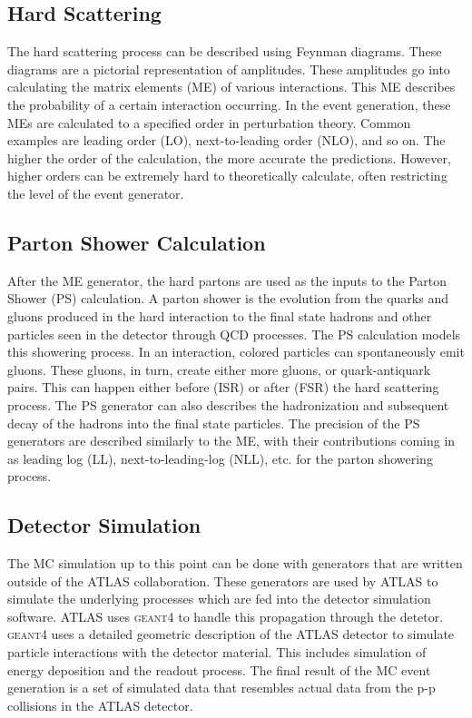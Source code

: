 \subsection{Hard Scattering}
\indent The hard scattering process can be described using Feynman diagrams. These diagrams are a pictorial representation of amplitudes. These amplitudes go into calculating the matrix elements (ME) of various interactions. This ME describes the probability of a certain interaction occurring. In the event generation, these MEs are calculated to a specified order in perturbation theory. Common examples are leading order (LO), next-to-leading order (NLO), and so on. The higher the order of the calculation, the more accurate the predictions. However, higher orders can be extremely hard to theoretically calculate, often restricting the level of the event generator.
\subsection{Parton Shower Calculation}
\indent  After the ME generator, the hard partons are used as the inputs to the Parton Shower (PS) calculation. A parton shower is the evolution from the quarks and gluons produced in the hard interaction to the final state hadrons and other particles seen in the detector through QCD processes. The PS calculation models this showering process. \newline
\indent In an interaction, colored particles can spontaneously emit gluons. These gluons, in turn, create either more gluons, or quark-antiquark pairs. This can happen either before (ISR) or after (FSR) the hard scattering process. The PS generator can also describes the hadronization and subsequent decay of the hadrons into the final state particles. \newline
\indent The precision of the PS generators are described similarly to the ME, with their contributions coming in as leading log (LL), next-to-leading-log (NLL), etc. for the parton showering process.
\subsection{Detector Simulation}
\indent The MC simulation up to this point can be done with generators that are written outside of the ATLAS collaboration. These generators are used by ATLAS to simulate the underlying processes which are fed into the detector simulation software. ATLAS uses \textsc{geant4} to handle this propagation\cite{geant4} through the detetor. \textsc{geant4} uses a detailed geometric description of the ATLAS detector to simulate particle interactions with the detector material. This includes simulation of energy deposition and the readout process. \newline
\indent The final result of the MC event generation is a set of simulated data that resembles actual data from the p-p collisions in the ATLAS detector.
